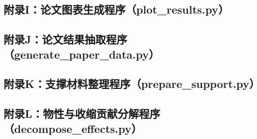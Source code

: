 \documentclass[zihao=-4,UTF8]{ctexart}
\begin{document}
\subsection*{附录I：论文图表生成程序（plot\_results.py）}

\subsection*{附录J：论文结果抽取程序（generate\_paper\_data.py）}

\subsection*{附录K：支撑材料整理程序（prepare\_support.py）}

\subsection*{附录L：物性与收缩贡献分解程序（decompose\_effects.py）}

\end{document}
